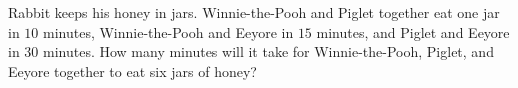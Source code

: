 Rabbit keeps his honey in jars. Winnie-the-Pooh and Piglet together eat one jar in $10$ minutes, Winnie-the-Pooh and Eeyore in $15$ minutes, and Piglet and Eeyore in $30$ minutes. How many minutes will it take for Winnie-the-Pooh, Piglet, and Eeyore together to eat six jars of honey?
